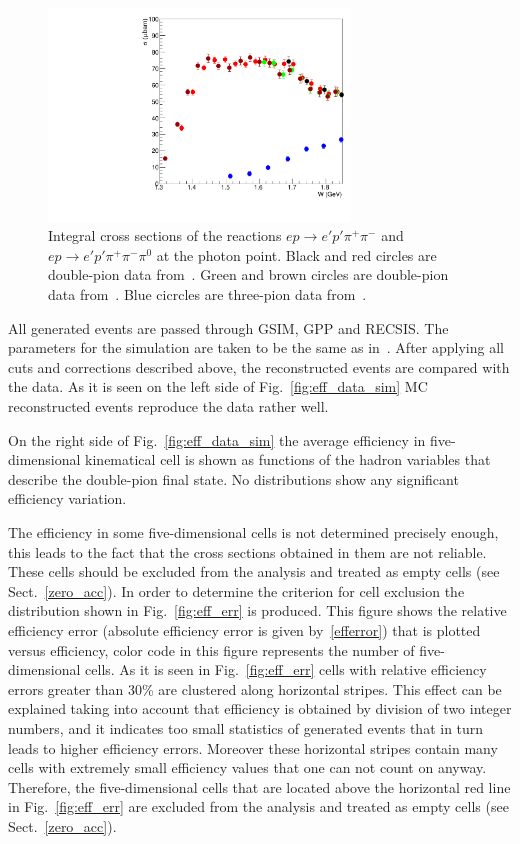 \begin{figure}[htp]
\begin{center}
\includegraphics[width=8cm]{pictures/cross_sction/efficiency/2pi_3pi.pdf}
\caption{\small Integral cross sections of the reactions $e p \rightarrow e'p'\pi^{+}\pi^{-}$ and $e p \rightarrow e'p'\pi^{+}\pi^{-}\pi^{0}$ at the photon point. Black and red circles are double-pion data from~\cite{Wu:2005wf}. Green and brown circles are double-pion data from~\cite{ABBHHM:1968aa}. Blue cicrcles are three-pion data from~\cite{Erbe:1970cq}.} \label{fig:eff_2pi_3pi}
\end{center}
\end{figure}

All generated events are passed through GSIM, GPP and RECSIS. The parameters for the simulation are taken to be the same as in~\cite{Markov:phd}. After applying all cuts and corrections described above, the reconstructed events are compared with the data. As it is seen on the left side of Fig.~\ref{fig:eff_data_sim} MC reconstructed events reproduce the data rather well.

On the right side of Fig.~\ref{fig:eff_data_sim} the average efficiency in five-dimensional kinematical cell is shown as functions of the hadron variables that describe the double-pion final state. No distributions show any significant efficiency variation. 

The efficiency in some five-dimensional cells is not determined precisely enough, this leads to the fact that the cross sections obtained in them are not reliable. These cells should be 
 excluded from the analysis and treated as empty cells (see Sect.~\ref{zero_acc}).
In order to determine the criterion for cell exclusion the distribution shown in Fig.~\ref{fig:eff_err} is produced.
This figure shows the relative efficiency error (absolute efficiency error is given by~\ref{efferror}) that is plotted versus efficiency, color code in this figure represents the number of five-dimensional cells. As it is seen in  Fig.~\ref{fig:eff_err} cells with relative efficiency errors greater than 30\% are clustered along horizontal stripes. This effect  can be explained taking into account that efficiency is obtained by division of two integer numbers, and it indicates too small statistics of generated events that in turn leads to higher efficiency errors. Moreover these horizontal stripes contain many cells with extremely small efficiency values that one can not count on anyway. Therefore,  the five-dimensional cells that are located above the horizontal red line in Fig.~\ref{fig:eff_err} are excluded from the analysis and treated as empty cells (see Sect.~\ref{zero_acc}).

